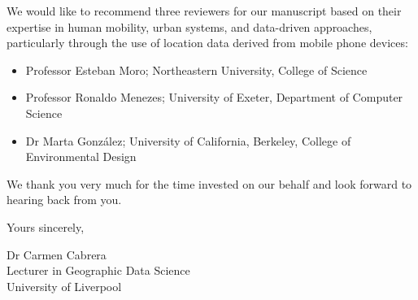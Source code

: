 \documentclass[fleqn,10pt]{letter}
\begin{document}

We would like to recommend three reviewers for our manuscript based on their expertise in human mobility, urban systems, and data-driven approaches, particularly through the use of location data derived from mobile phone devices:
\begin{itemize}
    \vspace{-1mm}
    \item Professor Esteban Moro; Northeastern University, College of Science
    \vspace{-1mm}
    \item Professor Ronaldo Menezes; University of Exeter, Department of Computer Science
    \vspace{-1mm}
    \item Dr Marta González; University of California, Berkeley, College of Environmental Design
\end{itemize}
\vspace{-1mm}
We thank you very much for the time invested on our behalf and look forward to hearing back from you.

Yours sincerely,

Dr Carmen Cabrera\\
Lecturer in Geographic Data Science\\
University of Liverpool
\end{document}
